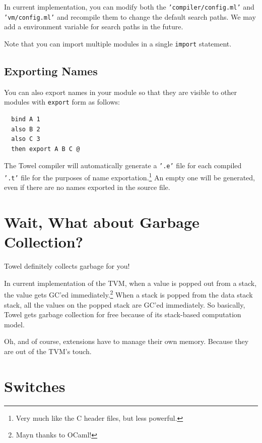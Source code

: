 \documentclass{report}
\begin{document}
\begin{mdframed}[style=detail]
  In current implementation, you can modify both the \texttt{'compiler/config.ml'} and \texttt{'vm/config.ml'} and recompile them to change the default search paths. We may add a environment variable for search paths in the future.
\end{mdframed}

Note that you can import multiple modules in a single \texttt{import} statement.

\subsection{Exporting Names}

You can also export names in your module so that they are visible to other modules with \texttt{export} form as follows:

\begin{mdframed}[style=example]
\begin{verbatim}
  bind A 1
  also B 2
  also C 3
  then export A B C @
\end{verbatim}
\end{mdframed}

The Towel compiler will automatically generate a \texttt{'.e'} file for each compiled \texttt{'.t'} file for the purposes of name exportation.\footnote{Very much like the C header files, but less powerful.} An empty one will be generated, even if there are no names exported in the source file.

\section{Wait, What about Garbage Collection?}

Towel definitely collects garbage for you!

In current implementation of the TVM, when a value is popped out from a stack, the value gets GC'ed immediately.\footnote{Mayn thanks to OCaml!} When a stack is popped from the data stack stack, all the values on the popped stack are GC'ed immediately. So basically, Towel gets garbage collection for free because of its stack-based computation model.

Oh, and of course, extensions have to manage their own memory. Because they are out of the TVM's touch.

\section{Switches}
\label{sec:switches}
\end{document}
